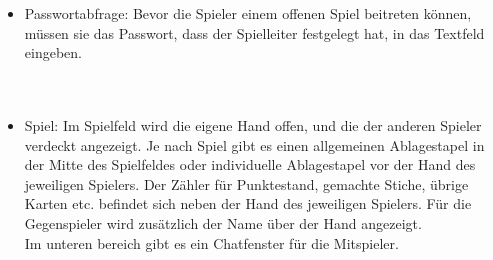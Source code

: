 \documentclass{article}
\begin{document}
\begin{itemize}
		\ \\
	\item Passwortabfrage: Bevor die Spieler einem offenen Spiel beitreten können, müssen sie das Passwort, dass der 						\gls{Spielleiter} festgelegt hat, in das Textfeld eingeben.\\
		\ \\
		\ \\
	\item Spiel: Im Spielfeld wird die eigene Hand offen, und die der anderen Spieler verdeckt angezeigt. Je nach Spiel gibt es 					einen allgemeinen Ablagestapel in der Mitte des Spielfeldes oder individuelle Ablagestapel vor der Hand des 					jeweiligen Spielers. Der Zähler für Punktestand, gemachte Stiche, übrige Karten etc. befindet sich neben  der 					Hand des jeweiligen Spielers. Für die Gegenspieler wird zusätzlich der Name über der Hand angezeigt.\\
			Im unteren bereich gibt es ein Chatfenster für die Mitspieler.\\
		\ \\
\end{itemize}
\end{document}
